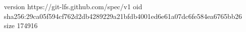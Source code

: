 version https://git-lfs.github.com/spec/v1
oid sha256:29ca05f594cf762d2db4289229a21bfdb4001ed6e61a07dc6fe584ea6765bb26
size 174916
